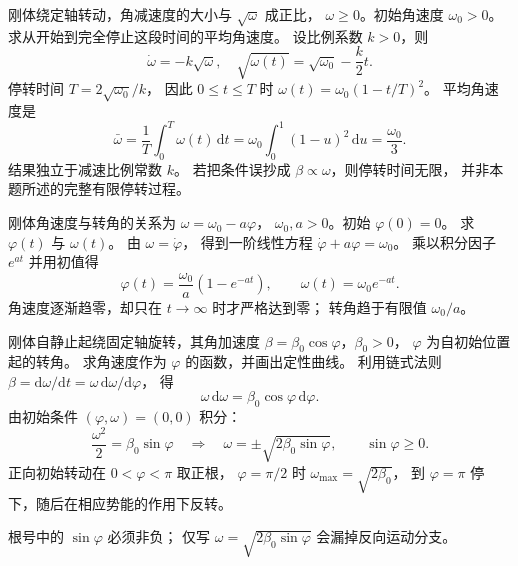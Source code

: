 刚体绕定轴转动，角减速度的大小与 $\sqrt{\omega}$ 成正比，
$\omega\ge0$。初始角速度 $\omega_0>0$。
求从开始到完全停止这段时间的平均角速度。
\exsolution
设比例系数 $k>0$，则
\[
 \dot\omega=-k\sqrt\omega,\quad
 \sqrt{\omega(t)}=\sqrt{\omega_0}-\frac{k}{2}t.
\]
停转时间 $T=2\sqrt{\omega_0}/k$，
因此 $0\le t\le T$ 时
$\omega(t)=\omega_0(1-t/T)^2$。
平均角速度是
\[
 \boxed{\bar\omega=\frac1T\int_0^T\omega(t)\,\mathrm dt
 =\omega_0\int_0^1(1-u)^2\,\mathrm du
 =\frac{\omega_0}{3}.}
\]
\excheck 结果独立于减速比例常数 $k$。
若把条件误抄成 $\beta\propto\omega$，则停转时间无限，
并非本题所述的完整有限停转过程。

刚体角速度与转角的关系为 $\omega=\omega_0-a\varphi$，
$\omega_0,a>0$。初始 $\varphi(0)=0$。
求 $\varphi(t)$ 与 $\omega(t)$。
\exsolution
由 $\omega=\dot\varphi$，
得到一阶线性方程
$\dot\varphi+a\varphi=\omega_0$。
乘以积分因子 $e^{at}$ 并用初值得
\[
 \boxed{\varphi(t)=\frac{\omega_0}{a}(1-e^{-at}),\qquad
 \omega(t)=\omega_0e^{-at}.}
\]
\excheck 角速度逐渐趋零，却只在 $t\to\infty$ 时才严格达到零；
转角趋于有限值 $\omega_0/a$。

刚体自静止起绕固定轴旋转，其角加速度
$\beta=\beta_0\cos\varphi$，$\beta_0>0$，
$\varphi$ 为自初始位置起的转角。
求角速度作为 $\varphi$ 的函数，并画出定性曲线。
\exsolution
利用链式法则
$\beta=\mathrm d\omega/\mathrm dt
=\omega\,\mathrm d\omega/\mathrm d\varphi$，
得
\[
 \omega\,\mathrm d\omega=\beta_0\cos\varphi\,\mathrm d\varphi .
\]
由初始条件 $(\varphi,\omega)=(0,0)$ 积分：
\[
 \frac{\omega^2}{2}=\beta_0\sin\varphi
 \quad\Longrightarrow\quad
 \boxed{\omega=\pm\sqrt{2\beta_0\sin\varphi}},
\qquad \sin\varphi\ge0.
\]
正向初始转动在 $0<\varphi<\pi$ 取正根，
$\varphi=\pi/2$ 时 $\omega_{\max}=\sqrt{2\beta_0}$，
到 $\varphi=\pi$ 停下，随后在相应势能的作用下反转。
\begin{center}
\end{center}
\excheck 根号中的 $\sin\varphi$ 必须非负；
仅写 $\omega=\sqrt{2\beta_0\sin\varphi}$ 会漏掉反向运动分支。
